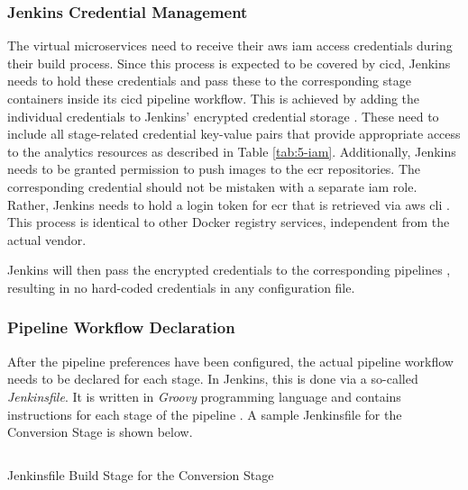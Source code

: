 \subsubsection{Jenkins Credential Management}
The virtual microservices need to receive their \ac{aws} \ac{iam} access credentials during their build process. Since this process is expected to be covered by \ac{cicd}, Jenkins needs to hold these credentials and pass these to the corresponding stage containers inside its \ac{cicd} pipeline workflow. This is achieved by adding the individual credentials to Jenkins' encrypted credential storage \cite{jenkins}. These need to include all stage-related credential key-value pairs that provide appropriate access to the analytics resources as described in Table \ref{tab:5-iam}. Additionally, Jenkins needs to be granted permission to push images to the \ac{ecr} repositories. The corresponding credential should not be mistaken with a separate \ac{iam} role. Rather, Jenkins needs to hold a login token for \ac{ecr} that is retrieved via \ac{aws} \acs{cli} \cite{ecr}. This process is identical to other Docker registry services, independent from the actual vendor.

Jenkins will then pass the encrypted credentials to the corresponding pipelines \cite{ecr}, resulting in no hard-coded credentials in any configuration file.

\subsubsection{Pipeline Workflow Declaration}
After the pipeline preferences have been configured, the actual pipeline workflow needs to be declared for each stage. In Jenkins, this is done via a so-called \textit{Jenkinsfile}. It is written in \textit{Groovy} programming language and contains instructions for each stage of the pipeline \cite{jenkins}. A sample Jenkinsfile for the Conversion Stage is shown below.

\begin{listing}[h!]
	\inputminted{groovy}{main-matter/src/5-jenkinsfile-build}
	\caption{Jenkinsfile Build Stage for the Conversion Stage}
	\label{src:5-jenkinsfile-build}
\end{listing}

